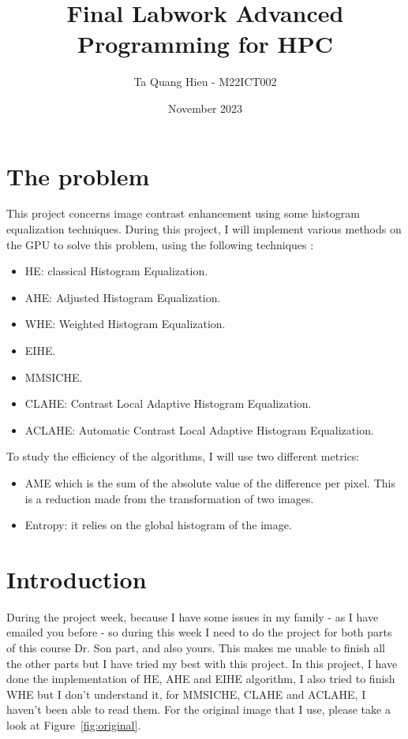 \documentclass{article}
\title{Final Labwork Advanced Programming for HPC}
\author{Ta Quang Hieu - M22ICT002}
\date{November 2023}
\begin{document}
	
	\maketitle
	
	\section{The problem}
	This project concerns image contrast enhancement using some histogram equalization techniques. During this project, I will implement various methods on the GPU to solve this problem, using the following techniques :
	
	\begin{itemize}
		\item HE: classical Histogram Equalization.
		\item AHE: Adjusted Histogram Equalization.
		\item WHE: Weighted Histogram Equalization.
		\item EIHE.
		\item MMSICHE.
		\item CLAHE: Contrast Local Adaptive Histogram Equalization.
		\item ACLAHE: Automatic Contrast Local Adaptive Histogram Equalization.
	\end{itemize}    
	
	To study the efficiency of the algorithms, I will use two different metrics:
	\begin{itemize}
		\item AME which is the sum of the absolute value of the difference per pixel. This is a reduction made from the transformation of two images.
		\item Entropy: it relies on the global histogram of the image.
	\end{itemize} 
	
	\section{Introduction}
	
	During the project week, because I have some issues in my family - as I have emailed you before - so during this week I need to do the project for both parts of this course Dr. Son part, and also yours. This makes me unable to finish all the other parts but I have tried my best with this project. In this project, I have done the implementation of HE, AHE and EIHE algorithm, I also tried to finish WHE but I don't understand it, for MMSICHE, CLAHE and ACLAHE, I haven't been able to read them. For the original image that I use, please take a look at Figure~\ref{fig:original}.
	
\end{document}
